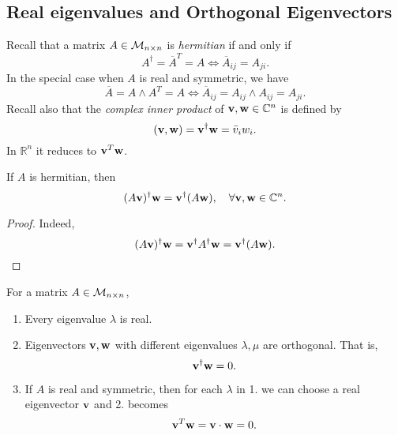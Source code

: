 \documentclass[10pt]{article}
\begin{document}
    \subsection{Real eigenvalues and Orthogonal Eigenvectors}
    Recall that a matrix $A\in {\mathcal{M}}_{n\times n}$ is \textit{hermitian} if and only if 
    \[
        A^{\dagger}=\overline{A}^T=A \Leftrightarrow \overline{A}_{ij}=A_{ji}.
    \]
    In the special case when $A$ is real and symmetric, we have 
    \[
        \overline{A}=A \land A^T=A \Leftrightarrow \overline{A}_{ij}=A_{ij}\land A_{ij}=A_{ji}.
    \]
    Recall also that the \textit{complex inner product} of ${\bf v},{\bf w} \in \mathbb{C}^{n}$ is defined by 
    \[
        ({\bf v},{\bf w})= {\bf v}^\dagger {\bf w}= \bar{v}_i w_i.
    \]
    In $ \mathbb{R}^{n} $ it reduces to $ {\bf v}^T {\bf w} $.
    \begin{lemma}
        If $A$ is hermitian, then 
        \[
            (A{\bf v})^\dagger {\bf w}={\bf v}^\dagger (A{\bf w}),\quad \forall {\bf v},{\bf w}\in \mathbb{C}^{n}.
        \]
    \end{lemma}
    \begin{proof}
        Indeed, 
        \[
            (A{\bf v})^\dagger {\bf w} = {\bf v}^\dagger A^\dagger {\bf w} = {\bf v}^\dagger (A{\bf w}).
        \]
    \end{proof}
    \begin{theorem}\label{thm:eigen for hermitians}
        For a matrix $ A\in {\mathcal{M}}_{n\times n} $,
        \begin{enumerate}
            \item Every eigenvalue $ \lambda $ is real.
            \item Eigenvectors $ {\bf v},{\bf w} $ with different eigenvalues $ \lambda,\mu $ are orthogonal. That is,
            \[
                {\bf v}^\dagger {\bf w}=0.
            \]
            \item If $A$ is real and symmetric, then for each $ \lambda $ in 1. we can choose a real eigenvector $ {\bf v} $ and 2. becomes 
            \[
                {\bf v}^T{\bf w}={\bf v} \cdot {\bf w}=0.
            \]
        \end{enumerate}
    \end{theorem}
\end{document}
